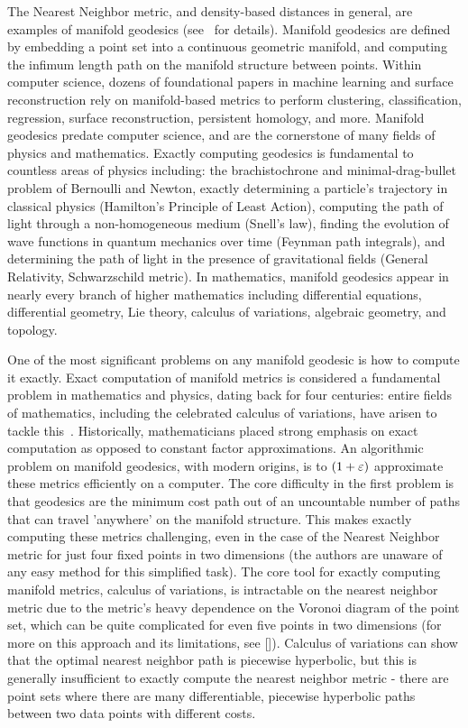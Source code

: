 The Nearest Neighbor metric, and density-based distances in general, are
examples of manifold geodesics (see~\cite{} for details). Manifold
geodesics are defined by embedding a point set into a continuous geometric
manifold, and computing the infimum length path on the manifold structure
between points.  Within computer science, dozens of foundational papers in
machine learning and surface reconstruction rely on manifold-based metrics
to perform clustering, classification, regression, surface reconstruction,
persistent homology, and more.  Manifold geodesics
predate computer science, and are the cornerstone of many fields of
physics and mathematics. Exactly computing geodesics is fundamental
to countless areas of physics including: the brachistochrone and
minimal-drag-bullet problem of Bernoulli and Newton, exactly determining a
particle's trajectory in classical physics (Hamilton's Principle of Least
Action), computing the path of light through a non-homogeneous medium
(Snell's law), finding the evolution of wave functions in quantum mechanics
over time (Feynman path integrals), and determining the path of light in
the presence of gravitational fields (General Relativity, Schwarzschild
metric). In mathematics, manifold geodesics appear in nearly every branch
of higher mathematics including differential equations, differential
geometry, Lie theory, calculus of variations, algebraic geometry, and
topology.  

One of the most significant problems on any manifold geodesic is how to
compute it exactly. Exact computation of manifold metrics is considered a
fundamental problem in mathematics and physics, dating back for four
centuries: entire fields of mathematics, including the celebrated calculus
of variations, have arisen to tackle this~\cite{}. Historically,
mathematicians placed strong emphasis on exact computation as opposed to
constant factor approximations. An algorithmic problem on manifold
geodesics, with modern origins, is to $(1+\varepsilon)$ approximate these metrics
efficiently on a computer. The core difficulty in the first problem is that
geodesics are the minimum cost path out of an uncountable number of paths
that can travel 'anywhere' on the manifold structure. This makes exactly
computing these metrics challenging, even in the case of the Nearest
Neighbor metric for just four fixed points in two dimensions (the authors
are unaware of any easy method for this simplified task). 
The core tool for exactly
computing manifold metrics, calculus of variations, is intractable on the
nearest neighbor metric due to the metric's heavy dependence on the Voronoi
diagram of the point set, which can be quite complicated for even five
points in two dimensions (for more on this approach and its limitations,
see []). Calculus of variations can show that the optimal nearest neighbor
path is piecewise hyperbolic, but this is generally insufficient to exactly
compute the nearest neighbor metric - there are point sets where there are
many differentiable, piecewise hyperbolic paths between two data points with
different costs.


